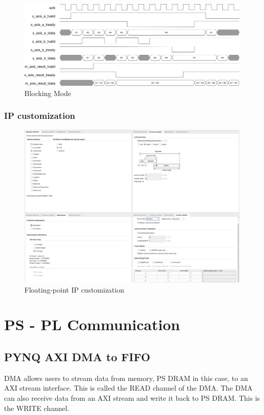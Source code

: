 \documentclass[a4paper, 12pt]{report}
\begin{document}
\begin{figure}[H]
    \centering
    \includegraphics[width = 15cm]{picture/IP Catalog/floating/ip-Page-21.drawio.png}
    \caption{Blocking Mode}
    \medskip
\end{figure}
\subsubsection{IP customization}
\begin{figure}[H]
    \centering
    \includegraphics[width = 15cm]{picture/IP Catalog/floating/ipfloatcustom.png}
    \caption{Floating-point IP customization}
    \medskip
\end{figure}

\section{PS - PL Communication}
\subsection{PYNQ AXI DMA to FIFO}
DMA allows users to stream data from memory, PS DRAM in this case, to an AXI stream interface. This is called the READ channel of the DMA. The DMA can also receive data from an AXI stream and write it back to PS DRAM. This is the WRITE channel.
\end{document}
